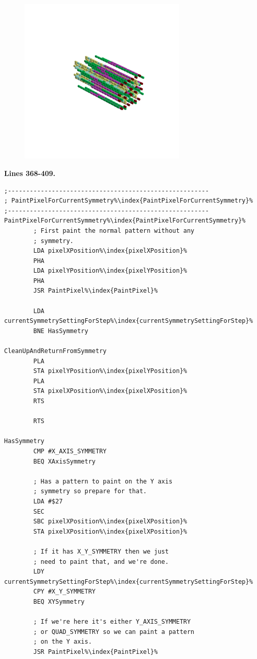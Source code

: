 \begin{minipage}[b]{0.50\linewidth}
\begin{figure}[H]
        \vspace*{-8cm}
        \hspace*{1cm}
        \includegraphics[width=8cm]{src/symmetries/pattern9_4-45.png}
        \vspace*{-2.5cm}
  \caption*{}
  \end{figure}
\end{minipage}

\clearpage
\textbf{Lines 368-409. }
\begin{lstlisting}[escapechar=\%]
;-------------------------------------------------------
; PaintPixelForCurrentSymmetry%\index{PaintPixelForCurrentSymmetry}%
;-------------------------------------------------------
PaintPixelForCurrentSymmetry%\index{PaintPixelForCurrentSymmetry}%   
        ; First paint the normal pattern without any
        ; symmetry.
        LDA pixelXPosition%\index{pixelXPosition}%
        PHA 
        LDA pixelYPosition%\index{pixelYPosition}%
        PHA 
        JSR PaintPixel%\index{PaintPixel}%

        LDA currentSymmetrySettingForStep%\index{currentSymmetrySettingForStep}%
        BNE HasSymmetry

CleanUpAndReturnFromSymmetry   
        PLA 
        STA pixelYPosition%\index{pixelYPosition}%
        PLA 
        STA pixelXPosition%\index{pixelXPosition}%
        RTS 

        RTS

HasSymmetry   
        CMP #X_AXIS_SYMMETRY
        BEQ XAxisSymmetry

        ; Has a pattern to paint on the Y axis
        ; symmetry so prepare for that.
        LDA #$27
        SEC 
        SBC pixelXPosition%\index{pixelXPosition}%
        STA pixelXPosition%\index{pixelXPosition}%

        ; If it has X_Y_SYMMETRY then we just 
        ; need to paint that, and we're done.
        LDY currentSymmetrySettingForStep%\index{currentSymmetrySettingForStep}%
        CPY #X_Y_SYMMETRY
        BEQ XYSymmetry

        ; If we're here it's either Y_AXIS_SYMMETRY
        ; or QUAD_SYMMETRY so we can paint a pattern
        ; on the Y axis.
        JSR PaintPixel%\index{PaintPixel}%

\end{lstlisting}
\clearpage

